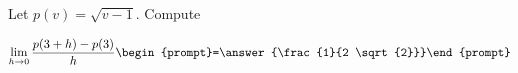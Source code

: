 \documentclass{ximera}
\author{Bart Snapp}
\begin{document}
\begin{exercise}
Let $p(v) = \sqrt{v-1}$. Compute

\[
\lim_{ h\to 0 } \frac{p(3+h)-p(3)}{h} \begin{prompt}=\answer{\frac{1}{2 \sqrt{2}}}\end{prompt}
\]
\end{exercise}
\end{document}
